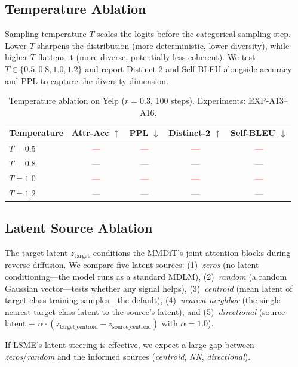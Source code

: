 \documentclass{article}
\newcommand{\tbd}[1]{\textcolor{red}{#1}}  %
\begin{document}
\subsection{Temperature Ablation}

Sampling temperature $T$ scales the logits before the categorical sampling step. Lower $T$ sharpens the distribution (more deterministic, lower diversity), while higher $T$ flattens it (more diverse, potentially less coherent). We test $T \in \{0.5, 0.8, 1.0, 1.2\}$ and report Distinct-2 and Self-BLEU alongside accuracy and PPL to capture the diversity dimension.

\begin{table}[h]
\centering
\caption{Temperature ablation on Yelp ($r=0.3$, 100 steps). Experiments: EXP-A13--A16.}
\label{tab:ablation_temperature}
\begin{tabular}{lcccc}
\toprule
\textbf{Temperature} & \textbf{Attr-Acc $\uparrow$} & \textbf{PPL $\downarrow$} & \textbf{Distinct-2 $\uparrow$} & \textbf{Self-BLEU $\downarrow$} \\
\midrule
$T = 0.5$ & \tbd{---} & \tbd{---} & \tbd{---} & \tbd{---} \\
$T = 0.8$ & \tbd{---} & \tbd{---} & \tbd{---} & \tbd{---} \\
$T = 1.0$ & \tbd{---} & \tbd{---} & \tbd{---} & \tbd{---} \\
$T = 1.2$ & \tbd{---} & \tbd{---} & \tbd{---} & \tbd{---} \\
\bottomrule
\end{tabular}
\end{table}

\subsection{Latent Source Ablation}

The target latent $z_\text{target}$ conditions the MMDiT's joint attention blocks during reverse diffusion. We compare five latent sources: (1)~\textit{zeros} (no latent conditioning---the model runs as a standard MDLM), (2)~\textit{random} (a random Gaussian vector---tests whether any signal helps), (3)~\textit{centroid} (mean latent of target-class training samples---the default), (4)~\textit{nearest neighbor} (the single nearest target-class latent to the source's latent), and (5)~\textit{directional} (source latent $+$ $\alpha \cdot (z_\text{target\_centroid} - z_\text{source\_centroid})$ with $\alpha = 1.0$).

If LSME's latent steering is effective, we expect a large gap between \textit{zeros}/\textit{random} and the informed sources (\textit{centroid}, \textit{NN}, \textit{directional}).
\end{document}
